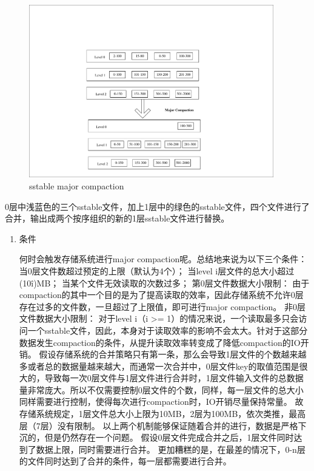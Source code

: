 \begin{enumerate}
\begin{enumerate}
				\begin{figure}[H]
					\centering
					\includegraphics[width=0.95\textwidth]{pdf/major_compaction.pdf}
					\caption{sstable major compaction}
					\label{sstable_major_compaction}
				\end{figure}
				
				0层中浅蓝色的三个sstable文件，加上1层中的绿色的sstable文件，四个文件进行了合并，输出成两个按序组织的新的1层sstable文件进行替换。
				

				\begin{enumerate}
					\item 条件
					
				何时会触发存储系统进行major compaction呢。总结地来说为以下三个条件：
				当0层文件数超过预定的上限（默认为4个）；
				当level i层文件的总大小超过(10\^i)MB；
				当某个文件无效读取的次数过多；
				第0层文件数据大小限制：
				由于compaction的其中一个目的是为了提高读取的效率，因此存储系统不允许0层存在过多的文件数，一旦超过了上限值，即可进行major compaction。
				非0层文件数据大小限制：
				对于level i（i >= 1）的情况来说，一个读取最多只会访问一个sstable文件，因此，本身对于读取效率的影响不会太大。针对于这部分数据发生compaction的条件，从提升读取效率转变成了降低compaction的IO开销。
				假设存储系统的合并策略只有第一条，那么会导致1层文件的个数越来越多或者总的数据量越来越大，而通常一次合并中，0层文件key的取值范围是很大的，导致每一次0层文件与1层文件进行合并时，1层文件输入文件的总数据量非常庞大。所以不仅需要控制0层文件的个数，同样，每一层文件的总大小同样需要进行控制，使得每次进行compaction时，IO开销尽量保持常量。
				故存储系统规定，1层文件总大小上限为10MB，2层为100MB，依次类推，最高层（7层）没有限制。
				以上两个机制能够保证随着合并的进行，数据是严格下沉的，但是仍然存在一个问题。
				假设0层文件完成合并之后，1层文件同时达到了数据上限，同时需要进行合并。
				更加糟糕的是，在最差的情况下，0-n层的文件同时达到了合并的条件，每一层都需要进行合并。
				

\end{enumerate}
\end{enumerate}
\end{enumerate}
